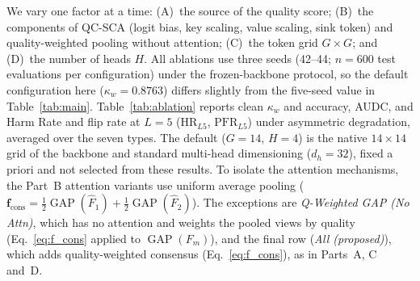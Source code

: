 \documentclass[final,5p,times,twocolumn,authoryear]{elsarticle}
\newcommand{\qcsca}{QC-SCA}
\theoremstyle{plain}
\theoremstyle{remark}
\begin{document}
We vary one factor at a time: (A)~the source of the quality score; (B)~the components of \qcsca{} (logit bias, key scaling, value scaling, sink token) and quality-weighted pooling without attention; (C)~the token grid $G\times G$; and (D)~the number of heads $H$. All ablations use three seeds (42--44; $n=600$ test evaluations per configuration) under the frozen-backbone protocol, so the default configuration here ($\kappa_w=0.8763$) differs slightly from the five-seed value in Table~\ref{tab:main}. Table~\ref{tab:ablation} reports clean $\kappa_w$ and accuracy, AUDC, and Harm Rate and flip rate at $L=5$ ($\text{HR}_{L5}$, $\text{PFR}_{L5}$) under asymmetric degradation, averaged over the seven types. The default ($G=14$, $H=4$) is the native $14\times14$ grid of the backbone and standard multi-head dimensioning ($d_h=32$), fixed a priori and not selected from these results. To isolate the attention mechanisms, the Part~B attention variants use uniform average pooling ($\mathbf{f}_{\text{cons}} = \tfrac{1}{2}\operatorname{GAP}(\hat{F}_1) + \tfrac{1}{2}\operatorname{GAP}(\hat{F}_2)$). The exceptions are \emph{Q-Weighted GAP (No Attn)}, which has no attention and weights the pooled views by quality (Eq.~\eqref{eq:f_cons} applied to $\operatorname{GAP}(F_m)$), and the final row (\emph{All (proposed)}), which adds quality-weighted consensus (Eq.~\eqref{eq:f_cons}), as in Parts~A, C and~D.
\end{document}
